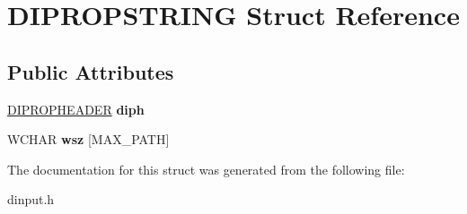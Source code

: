 \hypertarget{struct_d_i_p_r_o_p_s_t_r_i_n_g}{\section{D\-I\-P\-R\-O\-P\-S\-T\-R\-I\-N\-G Struct Reference}
\label{struct_d_i_p_r_o_p_s_t_r_i_n_g}
}
\subsection*{Public Attributes}
\begin{DoxyCompactItemize}
\item 
\hypertarget{struct_d_i_p_r_o_p_s_t_r_i_n_g_adb14b72ea37aef67d3675bc5a129728b}{\hyperlink{struct_d_i_p_r_o_p_h_e_a_d_e_r}{D\-I\-P\-R\-O\-P\-H\-E\-A\-D\-E\-R} {\bfseries diph}}\label{struct_d_i_p_r_o_p_s_t_r_i_n_g_adb14b72ea37aef67d3675bc5a129728b}

\item 
\hypertarget{struct_d_i_p_r_o_p_s_t_r_i_n_g_afdd1b93fcbde08028e3891c233708af6}{W\-C\-H\-A\-R {\bfseries wsz} \mbox{[}M\-A\-X\-\_\-\-P\-A\-T\-H\mbox{]}}\label{struct_d_i_p_r_o_p_s_t_r_i_n_g_afdd1b93fcbde08028e3891c233708af6}

\end{DoxyCompactItemize}


The documentation for this struct was generated from the following file\-:\begin{DoxyCompactItemize}
\item 
dinput.\-h\end{DoxyCompactItemize}
